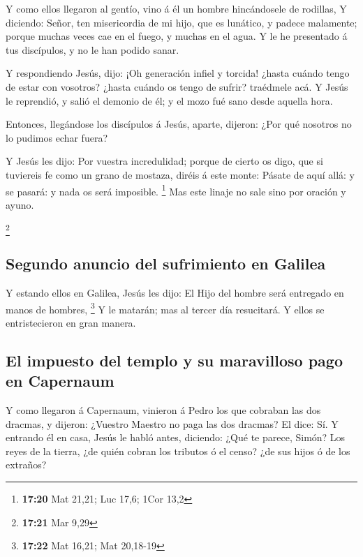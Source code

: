  Y como ellos llegaron al gentío, vino á él un hombre
hincándosele de rodillas,  Y diciendo: Señor, ten
misericordia de mi hijo, que es lunático, y padece malamente; porque
muchas veces cae en el fuego, y muchas en el agua.  Y le he
presentado á tus discípulos, y no le han podido sanar.

 Y respondiendo Jesús, dijo: ¡Oh generación infiel y
torcida! ¿hasta cuándo tengo de estar con vosotros? ¿hasta cuándo os
tengo de sufrir? traédmele acá.  Y Jesús le reprendió, y
salió el demonio de él; y el mozo fué sano desde aquella hora.

 Entonces, llegándose los discípulos á Jesús, aparte,
dijeron: ¿Por qué nosotros no lo pudimos echar fuera?

 Y Jesús les dijo: Por vuestra incredulidad; porque de
cierto os digo, que si tuviereis fe como un grano de mostaza, diréis á
este monte: Pásate de aquí allá: y se pasará: y nada os será imposible.
\footnote{\textbf{17:20} Mat 21,21; Luc 17,6; 1Cor 13,2} 
Mas este linaje no sale sino por oración y ayuno.

\footnote{\textbf{17:21} Mar 9,29}

\hypertarget{segundo-anuncio-del-sufrimiento-en-galilea}{%
\subsection{Segundo anuncio del sufrimiento en
Galilea}\label{segundo-anuncio-del-sufrimiento-en-galilea}}

 Y estando ellos en Galilea, Jesús les dijo: El Hijo del
hombre será entregado en manos de hombres, \footnote{\textbf{17:22} Mat
  16,21; Mat 20,18-19}  Y le matarán; mas al tercer día
resucitará. Y ellos se entristecieron en gran manera.

\hypertarget{el-impuesto-del-templo-y-su-maravilloso-pago-en-capernaum}{%
\subsection{El impuesto del templo y su maravilloso pago en
Capernaum}\label{el-impuesto-del-templo-y-su-maravilloso-pago-en-capernaum}}

 Y como llegaron á Capernaum, vinieron á Pedro los que
cobraban las dos dracmas, y dijeron: ¿Vuestro Maestro no paga las dos
dracmas?  El dice: Sí. Y entrando él en casa, Jesús le
habló antes, diciendo: ¿Qué te parece, Simón? Los reyes de la tierra,
¿de quién cobran los tributos ó el censo? ¿de sus hijos ó de los
extraños?

